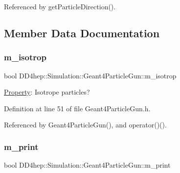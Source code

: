 Referenced by get\+Particle\+Direction().



\subsection{Member Data Documentation}
\hypertarget{class_d_d4hep_1_1_simulation_1_1_geant4_particle_gun_aba05dc63eaf9a7f7d06932d9f66eb154}{}\label{class_d_d4hep_1_1_simulation_1_1_geant4_particle_gun_aba05dc63eaf9a7f7d06932d9f66eb154} 
\subsubsection{\texorpdfstring{m\+\_\+isotrop}{m\_isotrop}}
{\footnotesize\ttfamily bool D\+D4hep\+::\+Simulation\+::\+Geant4\+Particle\+Gun\+::m\+\_\+isotrop\hspace{0.3cm}{\ttfamily [protected]}}



\hyperlink{class_d_d4hep_1_1_property}{Property}\+: Isotrope particles? 



Definition at line 51 of file Geant4\+Particle\+Gun.\+h.



Referenced by Geant4\+Particle\+Gun(), and operator()().

\hypertarget{class_d_d4hep_1_1_simulation_1_1_geant4_particle_gun_ac7ffd1d0ae00fc56978aef5cf7ec6b83}{}\label{class_d_d4hep_1_1_simulation_1_1_geant4_particle_gun_ac7ffd1d0ae00fc56978aef5cf7ec6b83} 
\subsubsection{\texorpdfstring{m\+\_\+print}{m\_print}}
{\footnotesize\ttfamily bool D\+D4hep\+::\+Simulation\+::\+Geant4\+Particle\+Gun\+::m\+\_\+print\hspace{0.3cm}{\ttfamily [protected]}}



